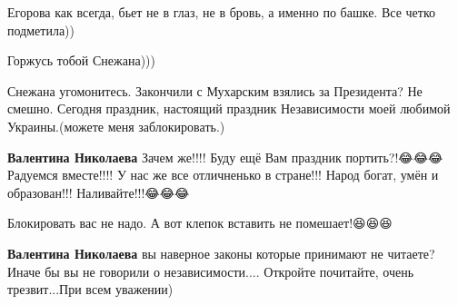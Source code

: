 \begin{itemize}
 

Егорова как всегда, бьет не в глаз, не в бровь, а именно по башке. Все четко
подметила))

Горжусь тобой Снежана)))


 

Снежана угомонитесь. Закончили с Мухарским взялись за Президента? Не
смешно. Сегодня праздник, настоящий праздник Независимости моей любимой
Украины.(можете меня заблокировать.)

\begin{itemize}
 
\textbf{Валентина Николаева} Зачем же!!!!
Буду ещё Вам праздник портить?!😂😂😂
Радуемся вместе!!!!
У нас же все отличненько в стране!!!
Народ богат, умён и образован!!!
Наливайте!!!😂😂😂

 
Блокировать вас не надо. А вот клепок вставить не помешает!😆😆😆

 
\textbf{Валентина Николаева} вы наверное законы которые принимают не читаете?
Иначе бы вы не говорили о независимости.... Откройте почитайте, очень
трезвит...При всем уважении)

 

\end{itemize}
\end{itemize}
